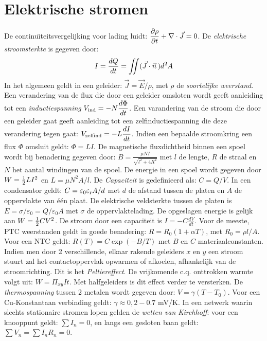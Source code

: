 \documentclass[twoside]{report}
\begin{document}
\section{Elektrische stromen}
De continu\"{\i}teitsvergelijking voor lading luidt:
$\displaystyle\frac{\partial \rho}{\partial t}+\nabla\cdot\vec{J}=0$.
De {\it elektrische stroomsterkte} is gegeven door:
\[
I=\frac{dQ}{dt}=\int\hspace{-1.5ex}\int(\vec{J}\cdot\vec{n}\,)d^2A
\]
In het algemeen geldt in een geleider: $\vec{J}=\vec{E}/\rho$, met $\rho$ de
{\it soortelijke weerstand}.
\npar
Een verandering van de flux die door een geleider omsloten wordt geeft
aanleiding tot een {\it inductiespanning}
$\displaystyle V_{\rm ind}=-N\frac{d\Phi}{dt}$. Een varandering van de stroom
die door een geleider gaat geeft aanleiding tot een zelfinductiespanning die
deze verandering tegen gaat: $\displaystyle V_{\rm zelfind}=-L\frac{dI}{dt}$.
Indien een bepaalde stroomkring een flux $\Phi$ omsluit geldt: $\Phi=LI$.
\npar
De magnetische fluxdichtheid binnen een spoel wordt bij benadering gegeven
door: $\displaystyle B=\frac{\mu NI}{\sqrt{l^2+4R^2}}$ met $l$ de lengte, $R$ de
straal en $N$ het aantal windingen van de spoel. De energie in een spoel wordt
gegeven door $W=\mbox{$\frac{1}{2}$} LI^2$ en $L=\mu N^2A/l$.
\npar
De {\it Capaciteit} is gedefinieerd als: $C=Q/V$. In een condensator geldt:
$C=\varepsilon_0\varepsilon_{\rm r}A/d$ met $d$ de afstand tussen de platen en $A$ de oppervlakte
van \'e\'en plaat. De elektrische veldsterkte tussen de platen is
$E=\sigma/\varepsilon_0=Q/\varepsilon_0A$ met $\sigma$ de oppervlaktelading. De opgeslagen
energie is gelijk aan $W=\mbox{$\frac{1}{2}$} CV^2$. De stroom door een capaciteit is
$\displaystyle I=-C\frac{dV}{dt}$.
\npar
Voor de meeste, PTC weerstanden geldt in goede benadering: $R=R_0(1+\alpha T)$,
met $R_0=\rho l/A$. Voor een NTC geldt: $R(T)=C\exp(-B/T)$ met $B$ en $C$
materiaalconstanten.
\npar
Indien men door 2 verschillende, elkaar rakende geleiders $x$ en $y$ een
stroom stuurt zal het contactoppervlak opwarmen of afkoelen, afhankelijk van
de stroomrichting. Dit is het {\it Peltiereffect}. De vrijkomende c.q.
onttrokken warmte volgt uit: $W=\Pi_{xy}It$. Met halfgeleiders is dit effect
verder te versterken.
\npar
De {\it thermospanning} tussen 2 metalen wordt gegeven door: $V=\gamma(T-T_0)$.
Voor een Cu-Konstantaan verbinding geldt: $\gamma\approx0,2-0.7$ mV/K.
\npar
In een netwerk waarin slechts stationaire stromen lopen gelden de {\it wetten
van Kirchhoff}: voor een knooppunt geldt: $\sum I_n=0$, en langs een gesloten
baan geldt: $\sum V_n=\sum I_nR_n=0$.
\end{document}
